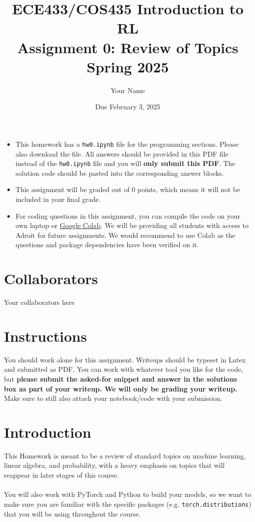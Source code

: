 \documentclass[12pt]{article}
\title{ECE433/COS435 Introduction to RL\\
  Assignment 0: Review of Topics\\
  Spring 2025\\
}
\date{Due February 3, 2025}
\author{\begin{fillme}[width=0.3\textwidth]
Your Name
\end{fillme}} %
\begin{document}
\maketitle
\noindent

\begin{itemize}
    \item This homework has a \texttt{hw0.ipynb} file for the programming sections. Please also download the file. All answers should be provided in this PDF file instead of the \texttt{hw0.ipynb} file and you will \textbf{only submit this PDF}. The solution code should be pasted into the corresponding answer blocks.
    \item This assignment will be graded out of 0 points, which means it will not be included in your final grade.
    \item For coding questions in this assignment, you can compile the code on your own laptop or \href{https://colab.research.google.com/}{Google Colab}. We will be providing all students with access to Adroit for future assignments. We would recommend to use Colab as the questions and package dependencies have been verified on it.
\end{itemize}

\newpage
\section*{Collaborators}
\begin{fillme}
Your collaborators here
\end{fillme}

\section*{Instructions}

You should work alone for this assignment. Writeups should be typeset in Latex and submitted as PDF. You can work with whatever tool you like for the code, but \textbf{please submit the asked-for snippet and answer in the solutions box as part of your writeup. We will only be grading your writeup.} Make sure to still also attach your notebook/code with your submission.

\section*{Introduction}
This Homework is meant to be a review of standard topics on machine learning, linear algebra, and probability, with a heavy emphasis on topics that will reappear in later stages of this course. 
\\\\
You will also work with PyTorch and Python to build your models, so we want to make sure you are familiar with the specific packages (e.g. \texttt{torch.distributions}) that you will be using throughout the course.
\newpage
\end{document}
